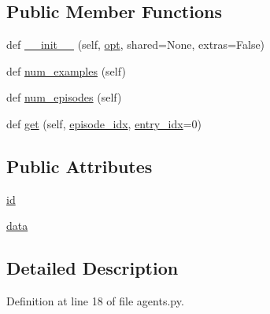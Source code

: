 \subsection*{Public Member Functions}
\begin{DoxyCompactItemize}
\item 
def \hyperlink{classparlai_1_1tasks_1_1dialogue__nli_1_1agents_1_1DialogueNliTeacher_ab6931a1fbc88ffc407f35ba72cc44b76}{\+\_\+\+\_\+init\+\_\+\+\_\+} (self, \hyperlink{classparlai_1_1core_1_1agents_1_1Teacher_a3ce6243860ce978a897922863ed32fa4}{opt}, shared=None, extras=False)
\item 
def \hyperlink{classparlai_1_1tasks_1_1dialogue__nli_1_1agents_1_1DialogueNliTeacher_a54d9ea8b89d8b5b91c913612fba74726}{num\+\_\+examples} (self)
\item 
def \hyperlink{classparlai_1_1tasks_1_1dialogue__nli_1_1agents_1_1DialogueNliTeacher_a1277b756af5d3ca234c77526a7bfb5e2}{num\+\_\+episodes} (self)
\item 
def \hyperlink{classparlai_1_1tasks_1_1dialogue__nli_1_1agents_1_1DialogueNliTeacher_aa3dfbefa7098aa0336896dd7ac5698b9}{get} (self, \hyperlink{classparlai_1_1core_1_1teachers_1_1FixedDialogTeacher_afd4ebab8063eb42d182d30a1a41f133e}{episode\+\_\+idx}, \hyperlink{classparlai_1_1core_1_1teachers_1_1FixedDialogTeacher_ae3201b15f3c3b46a2f3511bad9b43e7d}{entry\+\_\+idx}=0)
\end{DoxyCompactItemize}
\subsection*{Public Attributes}
\begin{DoxyCompactItemize}
\item 
\hyperlink{classparlai_1_1tasks_1_1dialogue__nli_1_1agents_1_1DialogueNliTeacher_aec219032386350b637684f9ab46a09ab}{id}
\item 
\hyperlink{classparlai_1_1tasks_1_1dialogue__nli_1_1agents_1_1DialogueNliTeacher_ae213e3aeb7ef16760a0c62ff1f77454e}{data}
\end{DoxyCompactItemize}


\subsection{Detailed Description}


Definition at line 18 of file agents.\+py.



